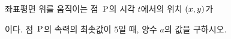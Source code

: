 좌표평면 위를 움직이는 점~$\mathrm{P}$의 시각 $t$에서의 위치 $(x{,}\mkern3mu\mathopen{}y)$가 \par\smallskip{}\par\smallskip\noindent 이다. 점~$\mathrm{P}$의 속력의 최솟값이 $5$일 때, 양수 $a$의 값을 구하시오.
